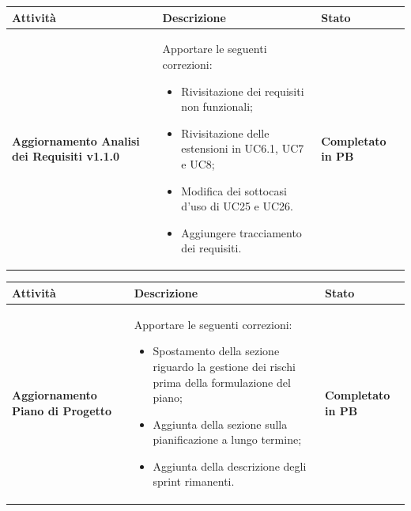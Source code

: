\documentclass[a4paper,12pt]{article}
\begin{document}
        {\renewcommand{\arraystretch}{1.4}
            \begin{table}[H]
            \centering
            \begin{tabularx}{\textwidth}{|X|X|X|}
                \hline
                \rowcolor{gold}
		    \textbf{Attività} & \textbf{Descrizione} & \textbf{Stato}\\
                \hline
		      \textbf{Aggiornamento Analisi dei Requisiti v1.1.0} & Apportare le seguenti correzioni:
		    \begin{itemize}
			    \item Rivisitazione dei requisiti non funzionali;
			    \item Rivisitazione delle estensioni in UC6.1, UC7 e UC8;
			    \item Modifica dei sottocasi d'uso di UC25 e UC26.
			    \item Aggiungere tracciamento dei requisiti.
		    \end{itemize}		    & \textbf{Completato in PB} \\
                \hline
              \end{tabularx}      
            \end{table}
        }

        {\renewcommand{\arraystretch}{1.4}
            \begin{table}[H]
            \centering
            \begin{tabularx}{\textwidth}{|X|X|X|}
                \hline
                \rowcolor{gold}
		    \textbf{Attività} & \textbf{Descrizione} & \textbf{Stato}\\
                \hline
		      \textbf{Aggiornamento Piano di Progetto} & Apportare le seguenti correzioni:
		    \begin{itemize}
			    \item Spostamento della sezione riguardo la gestione dei rischi prima della formulazione del piano;
			    \item Aggiunta della sezione sulla pianificazione a lungo termine;
			    \item Aggiunta della descrizione degli sprint rimanenti.
		    \end{itemize}		    & \textbf{Completato in PB} \\
                \hline
              \end{tabularx}      
            \end{table}
        }
\end{document}

